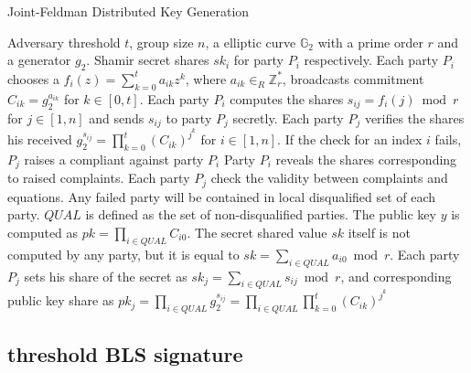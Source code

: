 \documentclass[11pt]{article}
\begin{document}
\begin{algorithm}
\caption{Joint-Feldman Distributed Key Generation\cite{gennaro2007secure}}\label{alg:jfdkg}
\begin{algorithmic}[1]
\Require Adversary threshold $t$, group size $n$, a elliptic curve $\mathbb{G}_2$ with a prime order $r$ and a generator $g_2$.
\Ensure Shamir secret shares $sk_i$ for party $P_i$ respectively.
\State Each party $P_i$ chooses a $f_i(z) = \sum_{k=0}^t a_{ik}z^{k}$, where $a_{ik} \in_R \mathbb{Z}_r^*$, broadcasts commitment $C_{ik} = g_2^{a_{ik}}$ for $k \in [0,t]$. Each party $P_i$ computes the shares $s_{ij} = f_i(j) \bmod r$ for $j \in [1,n]$ and sends $s_{ij}$ to party $P_j$ secretly.
\State Each party $P_j$ verifies the shares his received $g_2^{s_{ij}} = \prod_{k=0}^t(C_{ik})^{j^k}$ for $i \in [1,n]$. If the check for an index $i$ fails, $P_j$ raises a compliant against party $P_i$
\State Party $P_i$ reveals the shares corresponding to raised complaints. Each party $P_j$ check the validity between complaints and equations. Any failed party will be contained in local disqualified set of each party. $QUAL$ is defined as the set of non-disqualified parties.
\State The public key $y$ is computed as $pk = \prod_{i\in QUAL} C_{i0}$. The secret shared value $sk$ itself is not computed by any party, but it is equal to $sk = \sum_{i \in QUAL} a_{i0} \bmod r$. Each party $P_j$ sets his share of the secret as $sk_j = \sum_{i\in QUAL} s_{ij} \bmod r$, and corresponding public key share as $pk_j = \prod_{i \in QUAL} g_2^{s_{ij}} = \prod_{i \in QUAL} \prod_{k=0}^t (C_{ik})^{j^k}$
\end{algorithmic}
\end{algorithm}

\subsection{threshold BLS signature}
\end{document}
